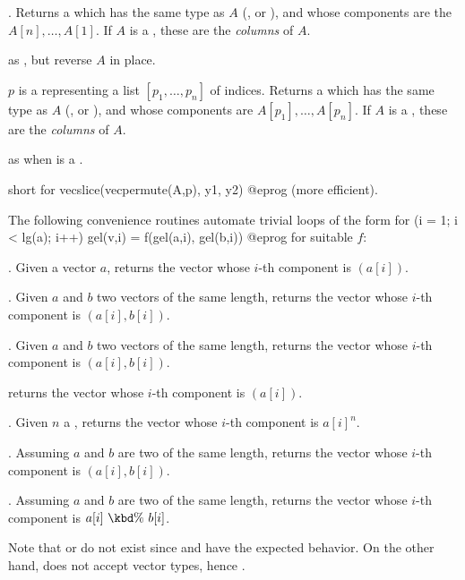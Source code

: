 . Returns a  which has the same
type as $A$ (,  or ), and whose components
are the $A[n],\dots,A[1]$. If $A$ is a , these are the
\emph{columns} of $A$.

 as , but reverse
$A$ in place.

 $p$ is a  representing
a list $[p_1,\dots,p_n]$ of indices. Returns a  which has the same
type as $A$ (,  or ), and whose components
are $A[p_1],\dots,A[p_n]$. If $A$ is a , these are the
\emph{columns} of $A$.

 as  when  is a
.

 short for
\bprog
  vecslice(vecpermute(A,p), y1, y2)
@eprog\noindent
(more efficient).


The following convenience routines automate trivial loops of the form
\bprog
  for (i = 1; i < lg(a); i++) gel(v,i) = f(gel(a,i), gel(b,i))
@eprog\noindent
for suitable $f$:

. Given a vector $a$,
returns the vector whose $i$-th component is $(a[i])$.

. Given $a$ and $b$ two vectors of the same
length, returns the vector whose $i$-th component is $(a[i], b[i])$.

. Given $a$ and $b$ two vectors of the same
length, returns the vector whose $i$-th component is $(a[i], b[i])$.

returns the vector whose $i$-th component is $(a[i])$.

. Given $n$ a , returns
the vector whose $i$-th component is $a[i]^n$.

. Assuming $a$ and $b$ are two 
of the same length, returns the vector whose $i$-th component
is $(a[i], b[i])$.

. Assuming $a$ and $b$ are two 
of the same length, returns the vector whose $i$-th component
is $a[i]~\kbd{\%}~b[i]$.

Note that  or  do not exist since 
and  have the expected behavior. On the other hand,
 does not accept vector types, hence .

